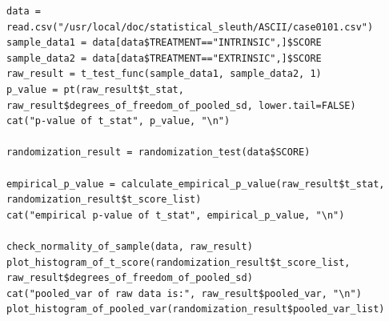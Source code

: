 \documentclass[a4paper,10pt]{article}
\begin{document}
\begin{verbatim}
data = read.csv("/usr/local/doc/statistical_sleuth/ASCII/case0101.csv")
sample_data1 = data[data$TREATMENT=="INTRINSIC",]$SCORE
sample_data2 = data[data$TREATMENT=="EXTRINSIC",]$SCORE
raw_result = t_test_func(sample_data1, sample_data2, 1)
p_value = pt(raw_result$t_stat, raw_result$degrees_of_freedom_of_pooled_sd, lower.tail=FALSE)
cat("p-value of t_stat", p_value, "\n")

randomization_result = randomization_test(data$SCORE)

empirical_p_value = calculate_empirical_p_value(raw_result$t_stat, randomization_result$t_score_list)
cat("empirical p-value of t_stat", empirical_p_value, "\n")

check_normality_of_sample(data, raw_result)
plot_histogram_of_t_score(randomization_result$t_score_list, raw_result$degrees_of_freedom_of_pooled_sd)
cat("pooled_var of raw data is:", raw_result$pooled_var, "\n")
plot_histogram_of_pooled_var(randomization_result$pooled_var_list)

\end{verbatim}
\end{document}

